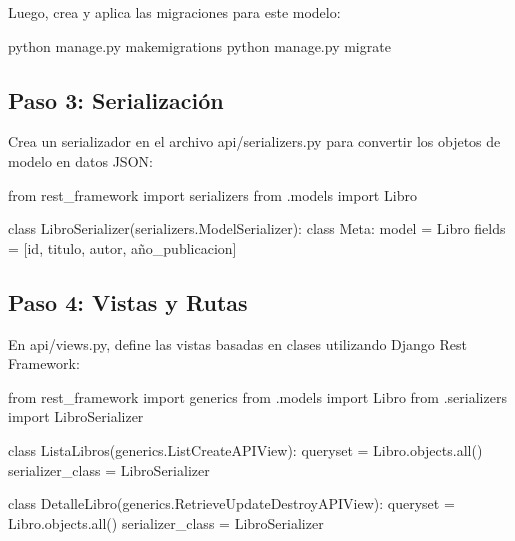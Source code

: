 \documentclass[
  a4paper,
  DIV=11,
  numbers=noendperiod,
  onepage,
  openany]{scrreprt}
\newenvironment{Shaded}{\begin{snugshade}}{\end{snugshade}}
\newcommand{\BuiltInTok}[1]{\textcolor[rgb]{0.00,0.23,0.31}{#1}}
\newcommand{\ExtensionTok}[1]{\textcolor[rgb]{0.00,0.23,0.31}{#1}}
\newcommand{\ImportTok}[1]{\textcolor[rgb]{0.00,0.46,0.62}{#1}}
\newcommand{\KeywordTok}[1]{\textcolor[rgb]{0.00,0.23,0.31}{#1}}
\newcommand{\NormalTok}[1]{\textcolor[rgb]{0.00,0.23,0.31}{#1}}
\newcommand{\OperatorTok}[1]{\textcolor[rgb]{0.37,0.37,0.37}{#1}}
\newcommand{\StringTok}[1]{\textcolor[rgb]{0.13,0.47,0.30}{#1}}
\begin{document}
Luego, crea y aplica las migraciones para este modelo:

\begin{Shaded}
\begin{Highlighting}[]
\ExtensionTok{python}\NormalTok{ manage.py makemigrations}
\ExtensionTok{python}\NormalTok{ manage.py migrate}
\end{Highlighting}
\end{Shaded}

\subsection{Paso 3: Serialización}\label{paso-3-serializaciuxf3n}

Crea un serializador en el archivo api/serializers.py para convertir los
objetos de modelo en datos JSON:

\begin{Shaded}
\begin{Highlighting}[]
\ImportTok{from}\NormalTok{ rest\_framework }\ImportTok{import}\NormalTok{ serializers}
\ImportTok{from}\NormalTok{ .models }\ImportTok{import}\NormalTok{ Libro}

\KeywordTok{class}\NormalTok{ LibroSerializer(serializers.ModelSerializer):}
    \KeywordTok{class}\NormalTok{ Meta:}
\NormalTok{        model }\OperatorTok{=}\NormalTok{ Libro}
\NormalTok{        fields }\OperatorTok{=}\NormalTok{ [}\StringTok{\textquotesingle{}id\textquotesingle{}}\NormalTok{, }\StringTok{\textquotesingle{}titulo\textquotesingle{}}\NormalTok{, }\StringTok{\textquotesingle{}autor\textquotesingle{}}\NormalTok{, }\StringTok{\textquotesingle{}año\_publicacion\textquotesingle{}}\NormalTok{]}
\end{Highlighting}
\end{Shaded}

\subsection{Paso 4: Vistas y Rutas}\label{paso-4-vistas-y-rutas}

En api/views.py, define las vistas basadas en clases utilizando Django
Rest Framework:

\begin{Shaded}
\begin{Highlighting}[]
\ImportTok{from}\NormalTok{ rest\_framework }\ImportTok{import}\NormalTok{ generics}
\ImportTok{from}\NormalTok{ .models }\ImportTok{import}\NormalTok{ Libro}
\ImportTok{from}\NormalTok{ .serializers }\ImportTok{import}\NormalTok{ LibroSerializer}

\KeywordTok{class}\NormalTok{ ListaLibros(generics.ListCreateAPIView):}
\NormalTok{    queryset }\OperatorTok{=}\NormalTok{ Libro.objects.}\BuiltInTok{all}\NormalTok{()}
\NormalTok{    serializer\_class }\OperatorTok{=}\NormalTok{ LibroSerializer}

\KeywordTok{class}\NormalTok{ DetalleLibro(generics.RetrieveUpdateDestroyAPIView):}
\NormalTok{    queryset }\OperatorTok{=}\NormalTok{ Libro.objects.}\BuiltInTok{all}\NormalTok{()}
\NormalTok{    serializer\_class }\OperatorTok{=}\NormalTok{ LibroSerializer}
\end{Highlighting}
\end{Shaded}
\end{document}
